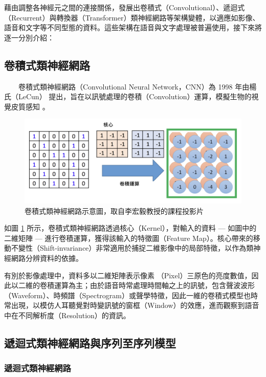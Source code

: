         藉由調整各神經元之間的連接關係，發展出卷積式（Convolutional）、遞迴式（Recurrent）與轉換器（Transformer）類神經網路等架構變體，以適應如影像、語音和文字等不同型態的資料。這些架構在語音與文字處理被普遍使用，接下來將逐一分別介紹：

\subsection{卷積式類神經網路}

　　卷積式類神經網路（Convolutional Neural Network，CNN）為 1998 年由楊氏（LeCun） \cite{lecun_gradient-based_1998} 提出，旨在以訊號處理的卷積（Convolution）運算，模擬生物的視覺皮質感知 \cite{hubel_receptive_1959} 。

\begin{figure}
    \centering
    \includegraphics[width=0.9\linewidth]{figures/cnnnew.png}
    \caption{卷積式類神經網路示意圖，取自李宏毅教授的課程投影片}
    \label{fig:cnn}
\end{figure}

        如圖 \ref{fig:cnn} 所示，卷積式類神經網路透過核心（Kernel），對輸入的資料 --- 如圖中的二維矩陣 --- 進行卷積運算，獲得該輸入的特徵圖（Feature Map）。核心帶來的移動不變性（Shift-invariance）非常適用於捕捉二維影像中的局部特徵，以作為類神經網路分辨資料的依據。

        有別於影像處理中，資料多以二維矩陣表示像素 （Pixel）三原色的亮度數值，因此以二維的卷積運算為主；由於語音時常處理時間軸之上的訊號，包含聲波波形（Waveform）、時頻譜（Spectrogram）或聲學特徵，因此一維的卷積式模型也時常出現，以模仿人耳聽覺對時變訊號的窗框（Window）的效應，進而觀察到語音中在不同解析度（Resolution）的資訊。

\subsection{遞迴式類神經網路與序列至序列模型}

\subsubsection{遞迴式類神經網路}

